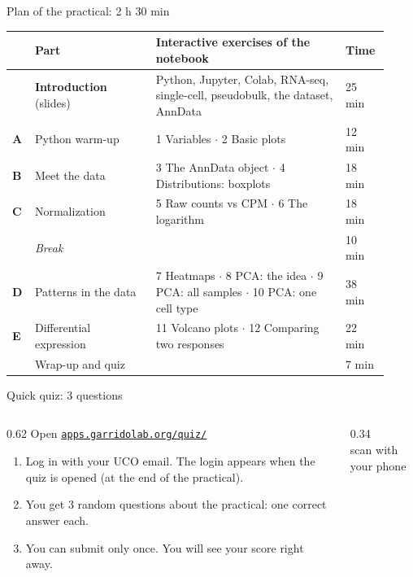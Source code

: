 \documentclass[aspectratio=169,10pt]{beamer}
\begin{document}
\begin{frame}{Plan of the practical: 2 h 30 min}
  \vspace{0.35cm}
  \scriptsize
  \begin{tabular}{@{}p{0.05\linewidth}p{0.30\linewidth}p{0.47\linewidth}p{0.10\linewidth}@{}}
    \toprule
    & \textbf{Part} & \textbf{Interactive exercises of the notebook} & \textbf{Time}\\\midrule
    & \textbf{Introduction} (slides) & Python, Jupyter, Colab, RNA-seq, single-cell, pseudobulk, the dataset, AnnData & 25 min\\[1pt]
    \textbf{A} & Python warm-up & 1 Variables $\cdot$ 2 Basic plots & 12 min\\[1pt]
    \textbf{B} & Meet the data & 3 The AnnData object $\cdot$ 4 Distributions: boxplots & 18 min\\[1pt]
    \textbf{C} & Normalization & 5 Raw counts vs CPM $\cdot$ 6 The logarithm & 18 min\\[1pt]
    & \textit{Break} & & 10 min\\[1pt]
    \textbf{D} & Patterns in the data & 7 Heatmaps $\cdot$ 8 PCA: the idea $\cdot$ 9 PCA: all samples $\cdot$ 10 PCA: one cell type & 38 min\\[1pt]
    \textbf{E} & Differential expression & 11 Volcano plots $\cdot$ 12 Comparing two responses & 22 min\\[1pt]
    & Wrap-up and quiz & & 7 min\\
    \bottomrule
  \end{tabular}
\end{frame}



\begin{frame}{Quick quiz: 3 questions}
  \begin{columns}[T]
    \begin{column}{0.62\textwidth}
      \large Open \href{https://apps.garridolab.org/quiz/}{\alert{\texttt{apps.garridolab.org/quiz/}}}
      \normalsize\vspace{0.3cm}

      \begin{enumerate}\setlength\itemsep{6pt}
        \item Log in with your \alert{UCO email}. The login appears when the quiz is opened (at the end of the practical).
        \item You get \alert{3 random questions} about the practical: one correct answer each.
        \item You can submit \alert{only once}. You will see your score right away.
      \end{enumerate}
    \end{column}
    \begin{column}{0.34\textwidth}
      \centering
      \\[4pt]
      \scriptsize scan with your phone
    \end{column}
  \end{columns}
\end{frame}
\end{document}
